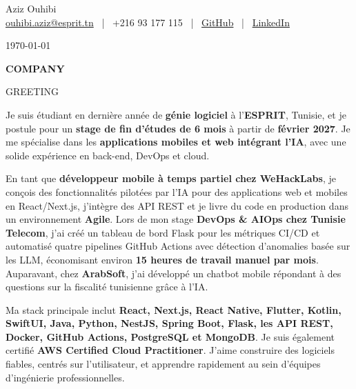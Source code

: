 \documentclass[12pt]{article}
\begin{document}
\begin{center}
{\Huge\color{accent} Aziz Ouhibi}\\[4pt]
\href{mailto:ouhibi.aziz@esprit.tn}{ouhibi.aziz@esprit.tn}
\ | \
+216 93 177 115
\ | \
\href{https://github.com/azizwhibi}{GitHub}
\ | \
\href{https://linkedin.com/in/azizouhibi}{LinkedIn}
\end{center}

\vspace{10pt}

\today

\vspace{4pt}

\textbf{{{COMPANY}}}

\vspace{10pt}

{{GREETING}}

\vspace{5pt}

Je suis étudiant en dernière année de \textbf{génie logiciel} à l'\textbf{ESPRIT}, Tunisie, et je postule pour un \textbf{stage de fin d'études de 6 mois} à partir de \textbf{février 2027}. Je me spécialise dans les \textbf{applications mobiles et web intégrant l'IA}, avec une solide expérience en back-end, DevOps et cloud.

\vspace{5pt}

En tant que \textbf{développeur mobile à temps partiel chez WeHackLabs}, je conçois des fonctionnalités pilotées par l'IA pour des applications web et mobiles en React/Next.js, j'intègre des API REST et je livre du code en production dans un environnement \textbf{Agile}. Lors de mon stage \textbf{DevOps \& AIOps chez Tunisie Telecom}, j'ai créé un tableau de bord Flask pour les métriques CI/CD et automatisé quatre pipelines GitHub Actions avec détection d'anomalies basée sur les LLM, économisant environ \textbf{15 heures de travail manuel par mois}. Auparavant, chez \textbf{ArabSoft}, j'ai développé un chatbot mobile répondant à des questions sur la fiscalité tunisienne grâce à l'IA.

\vspace{5pt}

Ma stack principale inclut \textbf{React, Next.js, React Native, Flutter, Kotlin, SwiftUI, Java, Python, NestJS, Spring Boot, Flask, les API REST, Docker, GitHub Actions, PostgreSQL et MongoDB}. Je suis également certifié \textbf{AWS Certified Cloud Practitioner}. J'aime construire des logiciels fiables, centrés sur l'utilisateur, et apprendre rapidement au sein d'équipes d'ingénierie professionnelles.
\end{document}
